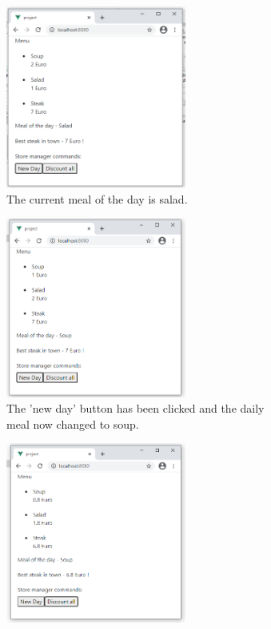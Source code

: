 \begin{figure}[H]
    \centering
    \begin{subfigure}[t]{0.65\textwidth}
         \centering
         \includegraphics[width=0.65\textwidth]{images/meal_1.png}
         \caption{The current meal of the day is salad.}
    \end{subfigure}\hfill%
    \begin{subfigure}[t]{0.65\textwidth}
        \centering
        \includegraphics[width=0.65\textwidth]{images/meal_2.png}
        \caption{The 'new day' button has been clicked and the daily meal now changed to soup.}
    \end{subfigure}\hfill%
    \begin{subfigure}[t]{0.65\textwidth}
        \centering
        \includegraphics[width=0.65\textwidth]{images/meal_3.png}

\end{subfigure}
\end{figure}
